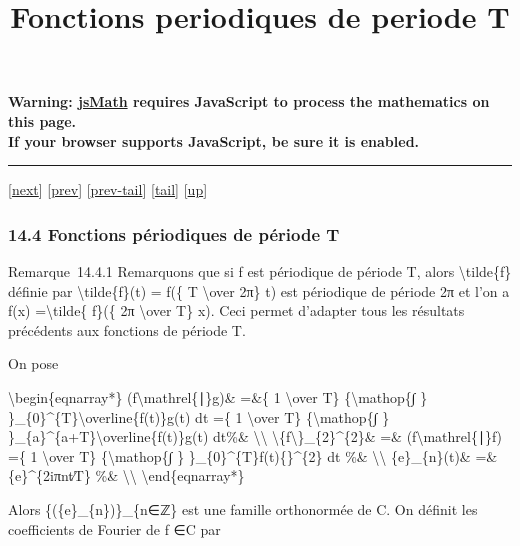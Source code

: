 \documentclass[]{article}
\title{Fonctions periodiques de periode T}
\author{}
\date{}
\begin{document}
\maketitle

\textbf{Warning: \href{http://www.math.union.edu/locate/jsMath}{jsMath}
requires JavaScript to process the mathematics on this page.\\ If your
browser supports JavaScript, be sure it is enabled.}

\begin{center}\rule{3in}{0.4pt}\end{center}

{[}\href{coursse81.html}{next}{]} {[}\href{coursse79.html}{prev}{]}
{[}\href{coursse79.html\#tailcoursse79.html}{prev-tail}{]}
{[}\hyperref[tailcoursse80.html]{tail}{]}
{[}\href{coursch15.html\#coursse80.html}{up}{]}

\subsubsection{14.4 Fonctions périodiques de période T}

Remarque~14.4.1 Remarquons que si f est périodique de période T, alors
\textbackslash{}tilde\{f\} définie par \textbackslash{}tilde\{f\}(t) =
f(\{ T \textbackslash{}over 2π\} t) est périodique de période 2π et l'on
a f(x) =\textbackslash{}tilde\{ f\}(\{ 2π \textbackslash{}over T\} x).
Ceci permet d'adapter tous les résultats précédents aux fonctions de
période T.

On pose

\textbackslash{}begin\{eqnarray*\} (f\textbackslash{}mathrel\{∣\}g)\&
=\&\{ 1 \textbackslash{}over T\} \{\textbackslash{}mathop\{∫ \}
\}\_\{0\}\^{}\{T\}\textbackslash{}overline\{f(t)\}g(t) dt =\{ 1
\textbackslash{}over T\} \{\textbackslash{}mathop\{∫ \}
\}\_\{a\}\^{}\{a+T\}\textbackslash{}overline\{f(t)\}g(t) dt\%\&
\textbackslash{}\textbackslash{}
\textbackslash{}\textbar{}\{f\textbackslash{}\textbar{}\}\_\{2\}\^{}\{2\}\&
=\& (f\textbackslash{}mathrel\{∣\}f) =\{ 1 \textbackslash{}over T\}
\{\textbackslash{}mathop\{∫ \}
\}\_\{0\}\^{}\{T\}\textbar{}f(t)\{\textbar{}\}\^{}\{2\} dt \%\&
\textbackslash{}\textbackslash{} \{e\}\_\{n\}(t)\& =\&
\{e\}\^{}\{2iπnt∕T\} \%\& \textbackslash{}\textbackslash{}
\textbackslash{}end\{eqnarray*\}

Alors \{(\{e\}\_\{n\})\}\_\{n∈ℤ\} est une famille orthonormée de C. On
définit les coefficients de Fourier de f ∈C par
\end{document}
